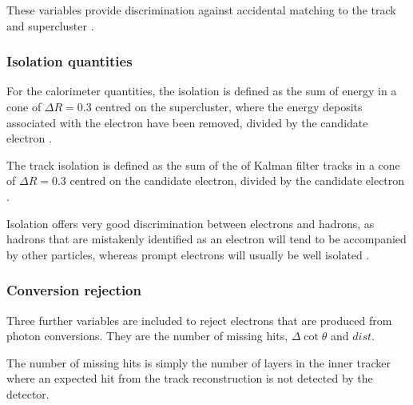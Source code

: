 These variables provide discrimination against accidental matching to the track and
supercluster \cite{baffioni2009identification}.

\subsubsection{Isolation quantities}
For the calorimeter quantities, the isolation is defined as the sum of energy in
a cone of $\Delta R = 0.3$ centred on the supercluster, where the energy
deposits associated with the electron have been removed, divided by the
candidate electron \Pt.

The track isolation is defined as the sum of the \Pt of Kalman filter tracks in
a cone of $\Delta R = 0.3 $ centred on the candidate electron, divided by the
candidate electron \Pt.

Isolation offers very good discrimination between electrons and hadrons, as
hadrons that are mistakenly identified as an electron will tend to be
accompanied by other particles, whereas prompt electrons will usually be well
isolated \cite{baffioni2009identification,nikos}.

\subsubsection{Conversion rejection}
Three further variables are included to reject electrons that are produced from
photon conversions. They are the number of missing hits, $\Delta\cot\theta$ and
$dist$. 

The number of missing hits is simply the number of layers in the inner
tracker where an expected hit from the track reconstruction is not detected by
the detector.


